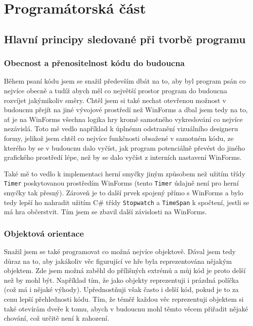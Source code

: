 \documentclass[a4]{article}
\begin{document}
\section{Programátorská část}
\subsection{Hlavní principy sledované při tvorbě programu}

\subsubsection{Obecnost a přenositelnost kódu do budoucna}
Během psaní kódu jsem se snažil především dbát na to, aby byl program psán co nejvíce obecně a tudíž abych měl co největší prostor program do budoucna rozvíjet jakýmikoliv směry. Chtěl jsem si také nechat otevřenou možnost v budoucnu přejít na jiné vývojové prostředí než WinForms a dbal jsem tedy na to, ať je na WinForms všechna logika hry kromě samotného vykreslování co nejvíce nezávislá. Toto mě vedlo například k úplnému odstranění vizuálního designeru formy, jelikož jsem chtěl co nejvíce funkčnosti obsažené v samotném kódu, ze kterého by se v budoucnu dalo vyčíst, jak program potenciálně převést do jiného grafického prostředí lépe, než by se dalo vyčíst z interních nastavení WinForms.

Také mě to vedlo k implementaci herní smyčky jiným způsobem než užitím třídy \verb|Timer| poskytovanou prostředím WinForms (tento \verb|Timer| údajně není pro herní smyčky tak přesný). Zároveň je to další prvek spojený přímo s WinForms a bylo tedy lepší ho nahradit užitím C\# třídy \verb|Stopwatch| a \verb|TimeSpan| k spočtení, jestli se má hra občerstvit. Tím jsem se zbavil další závislosti na WinForms.

\subsubsection{Objektová orientace}
Snažil jsem se také programovat co možná nejvíce objektově. Dával jsem tedy důraz na to, aby jakákoliv věc figurující ve hře byla reprezentována nějakým objektem. Zde jsem možná zaběhl do přílišných extrémů a můj kód je proto delší než by mohl být. Například tím, že jako objekty reprezentuji i prázdná políčka (což má i nějaké výhody). Upřednostňuji však často i delší kód, pokud je to za cenu lepší přehlednosti kódu. Tím, že téměř každou věc reprezentuji objektem si také otevírám dveře k tomu, abych v budoucnu mohl těmto věcem přiřadit nějaké chování, což určitě není k zahození.
\end{document}
